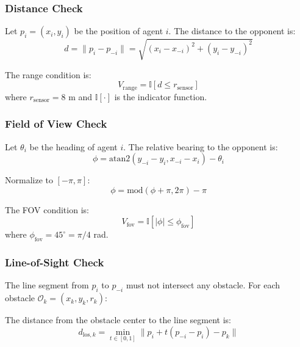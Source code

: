 \documentclass[11pt,a4paper]{report}
\begin{document}
\subsubsection{Distance Check}

Let $p_i = (x_i, y_i)$ be the position of agent $i$. The distance to the opponent is:
\begin{equation}
    d = \|p_i - p_{-i}\| = \sqrt{(x_i - x_{-i})^2 + (y_i - y_{-i})^2}
\end{equation}

The range condition is:
\begin{equation}
    V_{\text{range}} = \mathbb{I}[d \leq r_{\text{sensor}}]
\end{equation}
where $r_{\text{sensor}} = 8$ m and $\mathbb{I}[\cdot]$ is the indicator function.

\subsubsection{Field of View Check}

Let $\theta_i$ be the heading of agent $i$. The relative bearing to the opponent is:
\begin{equation}
    \phi = \text{atan2}(y_{-i} - y_i, x_{-i} - x_i) - \theta_i
\end{equation}

Normalize to $[-\pi, \pi]$:
\begin{equation}
    \phi = \text{mod}(\phi + \pi, 2\pi) - \pi
\end{equation}

The FOV condition is:
\begin{equation}
    V_{\text{fov}} = \mathbb{I}[|\phi| \leq \phi_{\text{fov}}]
\end{equation}
where $\phi_{\text{fov}} = 45^\circ = \pi/4$ rad.

\subsubsection{Line-of-Sight Check}

The line segment from $p_i$ to $p_{-i}$ must not intersect any obstacle. For each obstacle $\mathcal{O}_k = (x_k, y_k, r_k)$:

The distance from the obstacle center to the line segment is:
\begin{equation}
    d_{\text{los},k} = \min_{t \in [0,1]} \|p_i + t(p_{-i} - p_i) - p_k\|
\end{equation}
\end{document}
